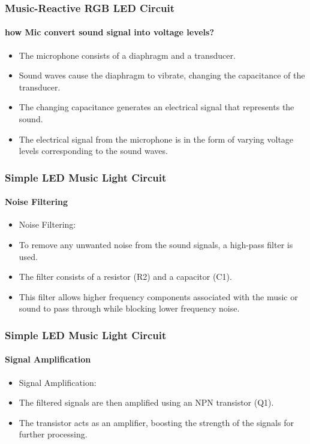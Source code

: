 \documentclass{beamer}
\begin{document}
\begin{frame}
\frametitle{Music-Reactive RGB LED Circuit}
\framesubtitle{how Mic convert sound signal into voltage levels?}
\begin{itemize}
  \item The microphone consists of a diaphragm and a transducer.
  \item Sound waves cause the diaphragm to vibrate, changing the capacitance of the transducer.
  \item The changing capacitance generates an electrical signal that represents the sound.
  \item The electrical signal from the microphone is in the form of varying voltage levels corresponding to the sound waves.
\end{itemize}
\end{frame}

\begin{frame}
\frametitle{Simple LED Music Light Circuit}
\framesubtitle{Noise Filtering}
\begin{itemize}
  \item Noise Filtering:
  \item To remove any unwanted noise from the sound signals, a high-pass filter is used.
  \item The filter consists of a resistor (R2) and a capacitor (C1).
  \item This filter allows higher frequency components associated with the music or sound to pass through while blocking lower frequency noise.
\end{itemize}
\end{frame}

\begin{frame}
\frametitle{Simple LED Music Light Circuit}
\framesubtitle{Signal Amplification}
\begin{itemize}
  \item Signal Amplification:
  \item The filtered signals are then amplified using an NPN transistor (Q1).
  \item The transistor acts as an amplifier, boosting the strength of the signals for further processing.
\end{itemize}
\end{frame}
\end{document}
